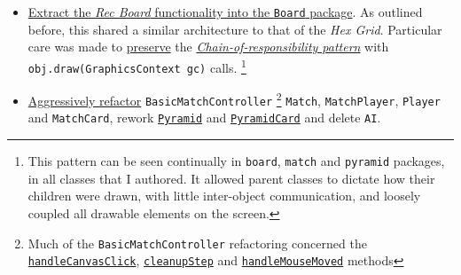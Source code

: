 \documentclass[11pt,a4paper]{report}
\begin{document}
\begin{itemize}

    \item \href{https://github.com/UQdeco2800/deco2800-2016-pyramidscheme/tree/master/pyramidscheme/src/main/java/uq/deco2800/pyramidscheme/board}{Extract the \textit{Rec Board} functionality into the \texttt{Board} package}. As outlined before, this shared a similar architecture to that of the \textit{Hex Grid}. Particular care was made to \href{https://github.com/UQdeco2800/deco2800-2016-pyramidscheme/search?utf8=%E2%9C%93&q=draw}{preserve} the \href{https://en.wikipedia.org/wiki/Chain-of-responsibility_pattern}{\textit{Chain-of-responsibility pattern}} with \texttt{obj.draw(GraphicsContext gc)} calls. \footnote{This pattern can be seen continually in \texttt{board}, \texttt{match} and \texttt{pyramid} packages, in all classes that I authored. It allowed parent classes to dictate how their children were drawn, with little inter-object communication, and loosely coupled all drawable elements on the screen.}

    \item \href{https://github.com/UQdeco2800/deco2800-2016-pyramidscheme/commit/f05430986c0f9fcf44f89f9b85694458bdd45811}{Aggressively refactor} \texttt{BasicMatchController} \footnote{Much of the \texttt{BasicMatchController} refactoring concerned the \href{https://github.com/UQdeco2800/deco2800-2016-pyramidscheme/blob/a98135fa78b9246c9abecdb7c4268ca2150176ba/pyramidscheme/src/main/java/uq/deco2800/pyramidscheme/controllers/BasicMatchController.java\#L309}{\texttt{handleCanvasClick}}, \href{https://github.com/UQdeco2800/deco2800-2016-pyramidscheme/blob/a98135fa78b9246c9abecdb7c4268ca2150176ba/pyramidscheme/src/main/java/uq/deco2800/pyramidscheme/controllers/BasicMatchController.java\#L454}{\texttt{cleanupStep}} and \href{https://github.com/UQdeco2800/deco2800-2016-pyramidscheme/blob/a98135fa78b9246c9abecdb7c4268ca2150176ba/pyramidscheme/src/main/java/uq/deco2800/pyramidscheme/controllers/BasicMatchController.java\#L562}{\texttt{handleMouseMoved}} methods} \texttt{Match}, \texttt{MatchPlayer}, \texttt{Player} and \texttt{MatchCard}, rework \href{https://github.com/UQdeco2800/deco2800-2016-pyramidscheme/blob/master/pyramidscheme/src/main/java/uq/deco2800/pyramidscheme/pyramid/Pyramid.java}{\texttt{Pyramid}} and \href{https://github.com/UQdeco2800/deco2800-2016-pyramidscheme/blob/master/pyramidscheme/src/main/java/uq/deco2800/pyramidscheme/pyramid/PyramidCard.java}{\texttt{PyramidCard}} and delete \texttt{AI}.

 \end{itemize}
\end{document}
